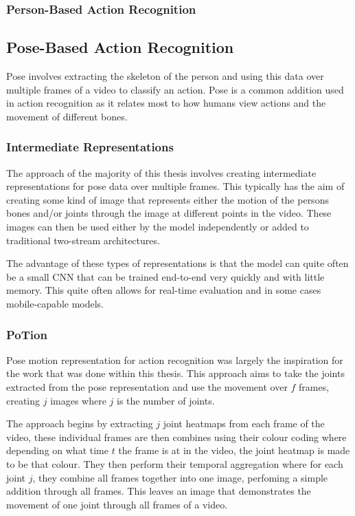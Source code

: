 \documentclass[10pt,twocolumn,letterpaper]{article}
\begin{document}
\subsubsection{Person-Based Action Recognition}

\subsection{Pose-Based Action Recognition}

Pose involves extracting the skeleton of the person and using this data over multiple frames of a video to classify an action. Pose is a common addition used in action recognition as it relates most to how humans view actions and the movement of different bones.

\subsubsection{Intermediate Representations}

The approach of the majority of this thesis involves creating intermediate representations for pose data over multiple frames. This typically has the aim of creating some kind of image that represents either the motion of the persons bones and/or joints through the image at different points in the video. These images can then be used either by the model independently or added to traditional two-stream architectures.

The advantage of these types of representations is that the model can quite often be a small CNN that can be trained end-to-end very quickly and with little memory. This quite often allows for real-time evaluation and in some cases mobile-capable models.

\subsubsection{PoTion}

Pose motion representation for action recognition \cite{potion} was largely the inspiration for the work that was done within this thesis. This approach aims to take the joints extracted from the pose representation and use the movement over $f$ frames, creating $j$ images where $j$ is the number of joints.

The approach begins by extracting $j$ joint heatmaps from each frame of the video, these individual frames are then combines using their colour coding where depending on what time $t$ the frame is at in the video, the joint heatmap is made to be that colour. They then perform their temporal aggregation where for each joint $j$, they combine all frames together into one image, perfoming a simple addition through all frames. This leaves an image that demonstrates the movement of one joint through all frames of a video.
\end{document}
